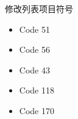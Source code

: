 \documentclass{ctexbeamer}
\begin{document}
\begin{frame}{修改列表项目符号}

\begin{itemize}
  \item[\ding{51}] Code 51
  \item[\ding{56}] Code 56
  \item[\ding{43}] Code 43
  \item[\ding{118}] Code 118
  \item[\ding{170}] Code 170
\end{itemize}

\end{frame}
\end{document}
